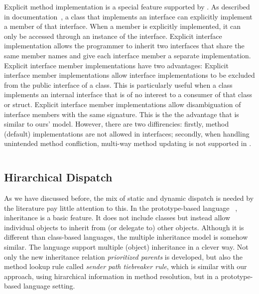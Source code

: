 Explicit method implementation is a special feature supported by \csharp. As described in \csharp
documentation~\cite{csharpdoc}, a class that implements an interface can explicitly implement a member of that
interface. When a member is explicitly implemented, it can only be accessed through an instance
of the interface. Explicit interface implementation allows the programmer to inherit two interfaces 
that share the same member names and give each interface member a separate implementation. 
Explicit interface member implementations have two advantages:
Explicit interface member implementations allow interface implementations to be excluded 
from the public interface of a class. This is particularly useful when a class implements an internal 
interface that is of no interest to a consumer of that class or struct.
Explicit interface member implementations allow disambiguation of interface members with the 
same signature. This is the the advantage that is similar to ours' model. However, there are two 
diffirencies: firstly, method (default) implementations are not allowed in \csharp interfaces; 
secondly, when handling unintended method confliction, multi-way method updating is not supported 
in \csharp.

\begin{lstlisting}
\end{lstlisting}

\subsection{Hirarchical Dispatch}
As we have discussed before, the mix of static and dynamic dispatch is needed by the literature 
pay little attention to this. In the prototype-based language \self~\cite{Chambers1991}, inheritance is a basic feature.
It does not include classes but instead allow individual objects to inherit from (or delegate to) other objects. 
Although it is different than class-based languages, the multiple inheritance model is somehow similar. The \self 
language support multiple (object) inheritance in a clever way. Not only the new inheritance
relation \emph{prioritized parents} is developed, but also the method lookup rule called 
\emph{sender path tiebreaker rule}, which is similar with our approach, using hirarchical 
information in method resolution, but in a prototype-based language setting.



